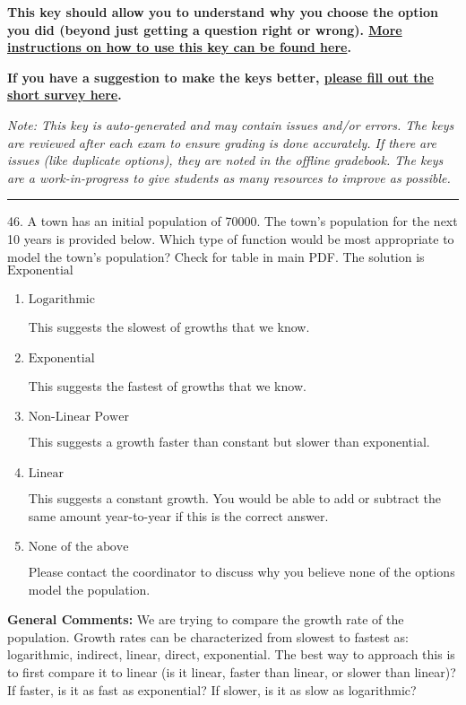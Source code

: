 \documentclass{extbook}[14pt]
\begin{document}
\textbf{This key should allow you to understand why you choose the option you did (beyond just getting a question right or wrong). \href{https://xronos.clas.ufl.edu/mac1105spring2020/courseDescriptionAndMisc/Exams/LearningFromResults}{More instructions on how to use this key can be found here}.}

\textbf{If you have a suggestion to make the keys better, \href{https://forms.gle/CZkbZmPbC9XALEE88}{please fill out the short survey here}.}

\textit{Note: This key is auto-generated and may contain issues and/or errors. The keys are reviewed after each exam to ensure grading is done accurately. If there are issues (like duplicate options), they are noted in the offline gradebook. The keys are a work-in-progress to give students as many resources to improve as possible.}

\rule{\textwidth}{0.4pt}

46. A town has an initial population of 70000. The town's population for the next 10 years is provided below. Which type of function would be most appropriate to model the town's population?
Check for table in main PDF. 
The solution is $ \text{Exponential} $ 

\begin{enumerate}[label=\Alph*.] 
\item $ \text{Logarithmic} $ 

 This suggests the slowest of growths that we know. 
\item $ \text{Exponential} $ 

 This suggests the fastest of growths that we know. 
\item $ \text{Non-Linear Power} $ 

 This suggests a growth faster than constant but slower than exponential. 
\item $ \text{Linear} $ 

 This suggests a constant growth. You would be able to add or subtract the same amount year-to-year if this is the correct answer. 
\item $ \text{None of the above} $ 

 Please contact the coordinator to discuss why you believe none of the options model the population. 
\end{enumerate} 
 
\textbf{General Comments:} We are trying to compare the growth rate of the population. Growth rates can be characterized from slowest to fastest as: logarithmic, indirect, linear, direct, exponential. The best way to approach this is to first compare it to linear (is it linear, faster than linear, or slower than linear)? If faster, is it as fast as exponential? If slower, is it as slow as logarithmic?
\end{document}
